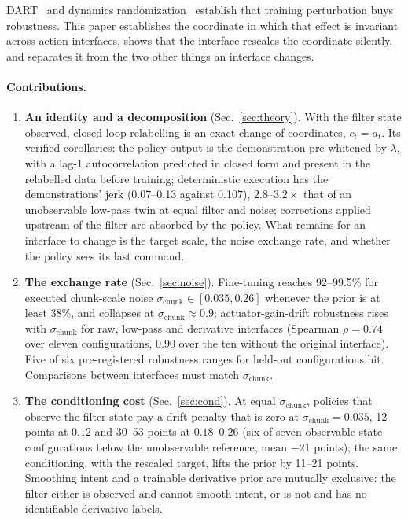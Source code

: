 \documentclass{article}
\newcommand{\schunk}{\sigma_{\mathrm{chunk}}}
\begin{document}
DART~\citep{laskey2017dart} and dynamics randomization~\citep{peng2018dynamicsrandomization} establish that training perturbation buys robustness. This paper establishes the coordinate in which that effect is invariant across action interfaces, shows that the interface rescales the coordinate silently, and separates it from the two other things an interface changes.

\paragraph{Contributions.}
\begin{enumerate}
\item \textbf{An identity and a decomposition} (Sec.~\ref{sec:theory}). With the filter state observed, closed-loop relabelling is an exact change of coordinates, $c_t=a_t$. Its verified corollaries: the policy output is the demonstration pre-whitened by $\lambda$, with a lag-1 autocorrelation predicted in closed form and present in the relabelled data before training; deterministic execution has the demonstrations' jerk (0.07--0.13 against 0.107), $2.8$--$3.2\times$ that of an unobservable low-pass twin at equal filter and noise; corrections applied upstream of the filter are absorbed by the policy. What remains for an interface to change is the target scale, the noise exchange rate, and whether the policy sees its last command.
\item \textbf{The exchange rate} (Sec.~\ref{sec:noise}). Fine-tuning reaches 92--99.5\% for executed chunk-scale noise $\schunk\in[0.035,0.26]$ whenever the prior is at least 38\%, and collapses at $\schunk\approx0.9$; actuator-gain-drift robustness rises with $\schunk$ for raw, low-pass and derivative interfaces (Spearman $\rho=0.74$ over eleven configurations, $0.90$ over the ten without the original interface). Five of six pre-registered robustness ranges for held-out configurations hit. Comparisons between interfaces must match $\schunk$.
\item \textbf{The conditioning cost} (Sec.~\ref{sec:cond}). At equal $\schunk$, policies that observe the filter state pay a drift penalty that is zero at $\schunk=0.035$, 12 points at $0.12$ and 30--53 points at $0.18$--$0.26$ (six of seven observable-state configurations below the unobservable reference, mean $-21$ points); the same conditioning, with the rescaled target, lifts the prior by 11--21 points. Smoothing intent and a trainable derivative prior are mutually exclusive: the filter either is observed and cannot smooth intent, or is not and has no identifiable derivative labels.
\end{enumerate}
\end{document}
